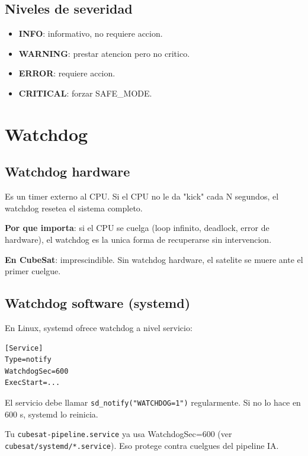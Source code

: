\documentclass[11pt,a4paper,oneside,openright]{book}
\begin{document}
\section{Niveles de severidad}

\begin{itemize}[leftmargin=2em]
  \item \textbf{INFO}: informativo, no requiere accion.
  \item \textbf{WARNING}: prestar atencion pero no critico.
  \item \textbf{ERROR}: requiere accion.
  \item \textbf{CRITICAL}: forzar SAFE\_MODE.
\end{itemize}

\chapter{Watchdog}

\section{Watchdog hardware}

Es un timer externo al CPU. Si el CPU no le da "kick" cada N segundos,
el watchdog resetea el sistema completo.

\textbf{Por que importa}: si el CPU se cuelga (loop infinito,
deadlock, error de hardware), el watchdog es la unica forma de
recuperarse sin intervencion.

\textbf{En CubeSat}: imprescindible. Sin watchdog hardware, el satelite
se muere ante el primer cuelgue.

\section{Watchdog software (systemd)}

En Linux, systemd ofrece watchdog a nivel servicio:

\begin{lstlisting}
[Service]
Type=notify
WatchdogSec=600
ExecStart=...
\end{lstlisting}

El servicio debe llamar \texttt{sd\_notify("WATCHDOG=1")} regularmente.
Si no lo hace en 600 s, systemd lo reinicia.

\begin{payload}
Tu \texttt{cubesat-pipeline.service} ya usa WatchdogSec=600 (ver
\texttt{cubesat/systemd/*.service}). Eso protege contra cuelgues del
pipeline IA.
\end{payload}
\end{document}
